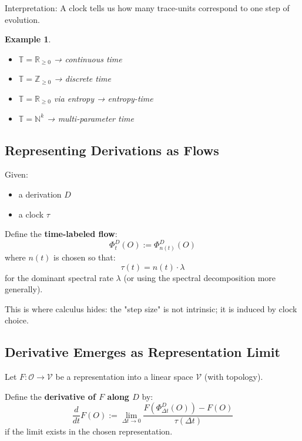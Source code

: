 \documentclass[12pt, oneside]{article}
\newtheorem{example}[theorem]{Example}
\newcommand{\Opr}{\mathcal{O}}
\begin{document}
Interpretation: A clock tells us how many trace-units correspond to one step of evolution.

\begin{example}
\begin{itemize}
    \item $\mathbb{T} = \mathbb{R}_{\geq 0}$ → continuous time
    \item $\mathbb{T} = \mathbb{Z}_{\geq 0}$ → discrete time
    \item $\mathbb{T} = \mathbb{R}_{\geq 0}$ via entropy → entropy-time
    \item $\mathbb{T} = \mathbb{N}^k$ → multi-parameter time
\end{itemize}
\end{example}

\subsection{Representing Derivations as Flows}

Given:
\begin{itemize}
    \item a derivation $D$
    \item a clock $\tau$
\end{itemize}

Define the \textbf{time-labeled flow}:
\begin{equation}
\Phi_t^D(O) := \Phi_{n(t)}^D(O)
\end{equation}
where $n(t)$ is chosen so that:
\begin{equation}
\tau(t) = n(t) \cdot \lambda
\end{equation}
for the dominant spectral rate $\lambda$ (or using the spectral decomposition more generally).

This is where calculus hides: the "step size" is not intrinsic; it is induced by clock choice.

\subsection{Derivative Emerges as Representation Limit}

Let $F: \Opr \rightarrow \mathcal{V}$ be a representation into a linear space $\mathcal{V}$ (with topology).

Define the \textbf{derivative of $F$ along $D$} by:
\begin{equation}
\frac{d}{dt} F(O) := \lim_{\Delta t \rightarrow 0} \frac{F(\Phi_{\Delta t}^D(O)) - F(O)}{\tau(\Delta t)}
\end{equation}
if the limit exists in the chosen representation.
\end{document}
